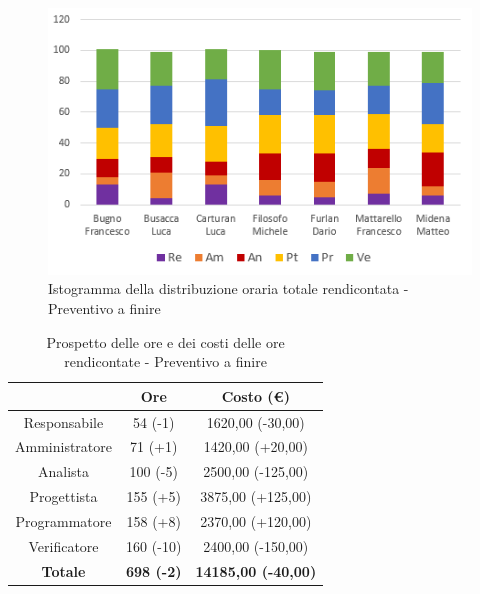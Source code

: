 \begin{figure}[H]
  \centering
  \includegraphics[scale=0.9]{immagini/ore_lavoro_preventivo_finire.png}
  \caption{Istogramma della distribuzione oraria totale rendicontata - Preventivo a finire}
\end{figure}


\begin{table}[H]
  \centering
  \renewcommand{\arraystretch}{1.8}
  \begin{tabular}{c|c|c}
    \rowcolor[HTML]{125E28}
    \multicolumn{1}{c}{\color[HTML]{FFFFFF}\textbf{Ruolo}}
                    & \multicolumn{1}{c}{\color[HTML]{FFFFFF}\textbf{Ore}}
                    & \multicolumn{1}{c}{\color[HTML]{FFFFFF}\textbf{Costo (€)}}                              \\
    \hline
    Responsabile    & 54 (-1)                                                    & 1620,00 (-30,00)           \\
    Amministratore  & 71 (+1)                                                    & 1420,00 (+20,00)           \\
    Analista        & 100 (-5)                                                   & 2500,00 (-125,00)          \\
    Progettista     & 155 (+5)                                                   & 3875,00 (+125,00)          \\
    Programmatore   & 158 (+8)                                                   & 2370,00 (+120,00)          \\
    Verificatore    & 160 (-10)                                                  & 2400,00 (-150,00)          \\
    \textbf{Totale} & \textbf{698 (-2)}                                          & \textbf{14185,00 (-40,00)} \\
  \end{tabular}
  \caption{Prospetto delle ore e dei costi delle ore rendicontate - Preventivo a finire}
\end{table}

